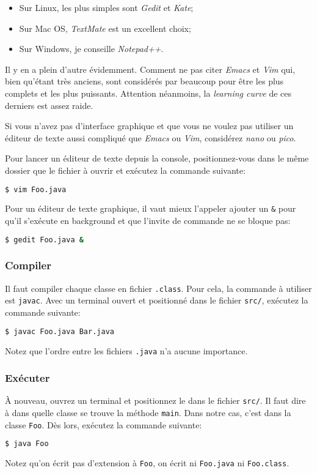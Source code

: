 \begin{itemize}
  \item Sur Linux, les plus simples sont {\em Gedit} et {\em Kate};
  \item Sur Mac OS, {\em TextMate} est un excellent choix;
  \item Sur Windows, je conseille {\em Notepad++}.
\end{itemize}

Il y en a plein d'autre évidemment. Comment ne pas citer {\em Emacs} et
{\em Vim} qui, bien qu'étant très anciens, sont considérés par beaucoup
pour être les plus complets et les plus puissants.
Attention néanmoins, la {\em learning curve} de ces derniers est assez raide.

Si vous n'avez pas d'interface graphique et que vous ne voulez pas utiliser
un éditeur de texte aussi compliqué que {\em Emacs} ou {\em Vim}, considérez
{\em nano} ou {\em pico}.

Pour lancer un éditeur de texte depuis la console,
positionnez-vous dans le même dossier que le fichier à ouvrir
et exécutez la commande suivante:
\begin{lstlisting}[language={sh}, morekeywords={vim}]
$ vim Foo.java
\end{lstlisting}
Pour un éditeur de texte graphique,
il vaut mieux l'appeler ajouter un \verb|&| pour qu'il s'exécute en
background et que l'invite de commande ne se bloque pas:

\begin{lstlisting}[language={sh}, morekeywords={gedit}]
$ gedit Foo.java &
\end{lstlisting}

\subsubsection{Compiler}
Il faut compiler chaque classe en fichier \verb|.class|.
Pour cela, la commande à utiliser est \verb|javac|.
Avec un terminal ouvert et positionné dans le fichier \verb|src/|,
exécutez la commande suivante:
\begin{lstlisting}[language={sh}, morekeywords={javac}]
$ javac Foo.java Bar.java
\end{lstlisting}
Notez que l'ordre entre les fichiers \verb|.java| n'a aucune importance.

\subsubsection{Exécuter}
À nouveau, ouvrez un terminal et positionnez le dans le fichier \verb|src/|.
Il faut dire à \java{} dans quelle classe se trouve la méthode \verb|main|.
Dans notre cas, c'est dans la classe \verb|Foo|.
Dès lors, exécutez la commande suivante:
\begin{lstlisting}[language={sh}, morekeywords={java}]
$ java Foo
\end{lstlisting}
Notez qu'on écrit pas d'extension à \verb|Foo|, on écrit ni \verb|Foo.java|
ni \verb|Foo.class|.


